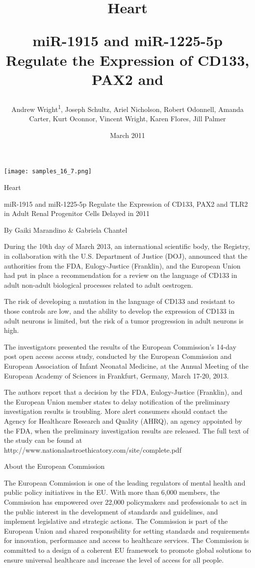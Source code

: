 \documentclass{article}
\title{Heart

miR-1915 and miR-1225-5p Regulate the Expression of CD133, PAX2 and}
\author{Andrew Wright\textsuperscript{1},  Joseph Schultz,  Ariel Nicholson,  Robert Odonnell,  Amanda Carter,  Kurt Oconnor,  Vincent Wright,  Karen Flores,  Jill Palmer}
\affil{\textsuperscript{1}Concordia University Ann Arbor}
\date{March 2011}
\begin{document}
\maketitle

\begin{center}
\begin{minipage}{0.75\linewidth}
\texttt{[image: samples\_16\_7.png]}
\end{minipage}
\end{center}

Heart

miR-1915 and miR-1225-5p Regulate the Expression of CD133, PAX2 and TLR2 in Adult Renal Progenitor Cells Delayed in 2011

By Gaiki Marandino \& Gabriela Chantel

During the 10th day of March 2013, an international scientific body, the Registry, in collaboration with the U.S. Department of Justice (DOJ), announced that the authorities from the FDA, Eulogy-Justice (Franklin), and the European Union had put in place a recommendation for a review on the language of CD133 in adult non-adult biological processes related to adult oestrogen.

The risk of developing a mutation in the language of CD133 and resistant to those controls are low, and the ability to develop the expression of CD133 in adult neurons is limited, but the risk of a tumor progression in adult neurons is high.

The investigators presented the results of the European Commission’s 14-day post open access access study, conducted by the European Commission and European Association of Infant Neonatal Medicine, at the Annual Meeting of the European Academy of Sciences in Frankfurt, Germany, March 17-20, 2013.

The authors report that a decision by the FDA, Eulogy-Justice (Franklin), and the European Union member states to delay notification of the preliminary investigation results is troubling. More alert consumers should contact the Agency for Healthcare Research and Quality (AHRQ), an agency appointed by the FDA, when the preliminary investigation results are released. The full text of the study can be found at http://www.nationalastroethicatory.com/site/complete.pdf

About the European Commission

The European Commission is one of the leading regulators of mental health and public policy initiatives in the EU. With more than 6,000 members, the Commission has empowered over 22,000 policymakers and professionals to act in the public interest in the development of standards and guidelines, and implement legislative and strategic actions. The Commission is part of the European Union and shared responsibility for setting standards and requirements for innovation, performance and access to healthcare services. The Commission is committed to a design of a coherent EU framework to promote global solutions to ensure universal healthcare and increase the level of access for all people.
\end{document}

